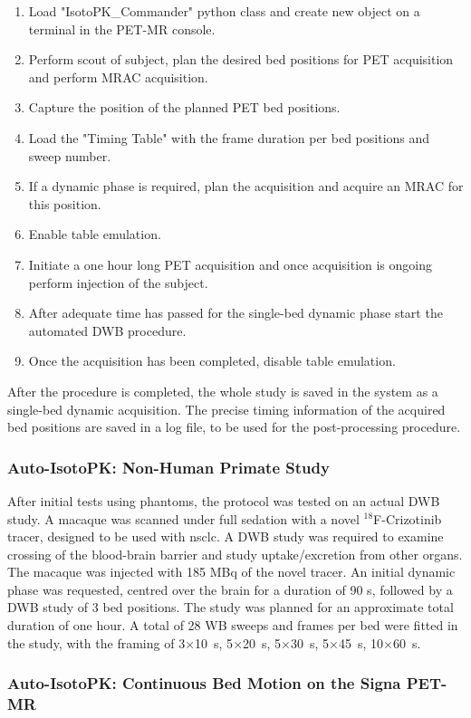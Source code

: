 \begin{enumerate}
    \item Load "IsotoPK\_Commander" python class and create new object on a terminal in the PET-MR console. 
    \item Perform scout of subject, plan the desired bed positions for PET acquisition and perform MRAC acquisition. 
    \item Capture the position of the planned PET bed positions.
    \item Load the "Timing Table" with the frame duration per bed positions and sweep number.
    \item If a dynamic phase is required, plan the acquisition and acquire an MRAC for this position. 
    \item Enable table emulation. 
    \item Initiate a one hour long PET acquisition and once acquisition is ongoing perform injection of the subject. 
    \item After adequate time has passed for the single-bed dynamic phase start the automated DWB procedure. 
    \item Once the acquisition has been completed, disable table emulation. 
\end{enumerate}

After the procedure is completed, the whole study is saved in the system as a single-bed dynamic acquisition. The precise timing information of the acquired bed positions are saved in a log file, to be used for the post-processing procedure. 

\subsubsection{Auto-IsotoPK: Non-Human Primate Study}
After initial tests using phantoms, the protocol was tested on an actual DWB study. A macaque was scanned under full sedation with a novel $^{18}$F-Crizotinib tracer, designed to be used with \gls{nsclc}. A DWB study was required to examine crossing of the blood-brain barrier and study uptake/excretion from other organs. The macaque was injected with 185 \si{\mega \becquerel} of the novel tracer. An initial dynamic phase was requested, centred over the brain for a duration of 90 s, followed by a DWB study of 3 bed positions. The study was planned for an approximate total duration of one hour. A total of 28 WB sweeps and frames per bed were fitted in the study, with the framing of 3$\times$10~\si{\s}, 5$\times$20~\si{\s}, 5$\times$30~\si{\s}, 5$\times$45~\si{\s}, 10$\times$60~\si{\s}. 



\subsubsection{Auto-IsotoPK: Continuous Bed Motion on the Signa PET-MR}
